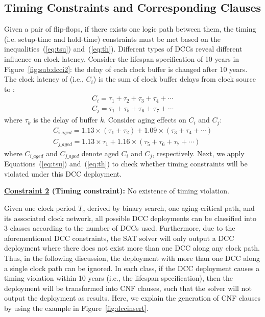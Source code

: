 \subsection{Timing Constraints and Corresponding Clauses}
\label{subsec:tccc}
Given a pair of flip-flops, if there exists one logic path between them, the timing (i.e. setup-time and hold-time) constraints must be met based on the inequalities~(\ref{eq:tsu}) and~(\ref{eq:th}). Different types of DCCs reveal different influence on clock latency. Consider the lifespan specification of 10 years in Figure~\ref{fig:sub:dcci2}: the delay of each clock buffer is changed after 10 years. The clock latency of  (i.e., $C_i$) is the sum of clock buffer delays from clock source to : 
\begin{gather*}
C_i = \tau_1 + \tau_2 + \tau_3 + \tau_4 +\dotsb \\
C_j = \tau_1 + \tau_5 + \tau_6 + \tau_7 +\dotsb
\end{gather*}
where $\tau_k$ is the delay of buffer $k$. Consider aging effects on $C_i$ and $C_j$: 
\begin{gather*}
C_{i\_aged} = 1.13 \times \left(\tau_1 + \tau_2\right) + 1.09 \times \left(\tau_3 + \tau_4 + \dotsb\right)\\
C_{j\_aged} = 1.13 \times \tau_1+ 1.16 \times \left( \tau_5 + \tau_6 + \tau_7 + \dotsb \right)
\end{gather*}
where $C_{i\_aged}$ and $C_{j\_aged}$ denote aged $C_i$ and $C_j$, respectively. Next, we apply Equations~(\ref{eq:tsu}) and~(\ref{eq:th}) to check whether timing constraints will be violated under this DCC deployment.

\noindent \textbf{\uline{Constraint 2} (Timing constraint):} No existence of timing violation.


Given one clock period $T_c$ derived by binary search, one aging-critical path, and its associated clock network, all possible DCC deployments can be classified into 3 classes according to the number of DCCs used. Furthermore, due to the aforementioned DCC constraints, the SAT solver will only output a DCC deployment where there does not exist more than one DCC along any clock path. Thus, in the following discussion, the deployment with more than one DCC along a single clock path can be ignored. In each class, if the DCC deployment causes a timing violation within 10 years (i.e., the lifespan specification), then the deployment will be transformed into CNF clauses, such that the solver will not output the deployment as results. Here, we explain the generation of CNF clauses by using the example in Figure~\ref{fig:dccinsert}.\\

